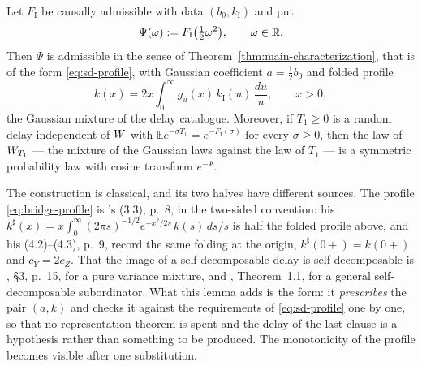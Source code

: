 \begin{lemma}\label{lem:bridge-exponents}
Let $F_{\mathrm I}$ be causally admissible with data $(b_0, k_{\mathrm I})$ and put
\begin{equation}\label{eq:bridge}
  \Psi(\omega) := F_{\mathrm I}\bigl(\tfrac12\omega^2\bigr), \qquad \omega \in \mathbb{R} .
\end{equation}
Then $\Psi$ is admissible in the sense of Theorem~\ref{thm:main-characterization}, that is of
the form \ref{eq:sd-profile}, with Gaussian coefficient $a = \tfrac12 b_0$ and folded profile
\begin{equation}\label{eq:bridge-profile}
  k(x) = 2x\int_0^\infty g_u(x)\,k_{\mathrm I}(u)\,\frac{du}{u}, \qquad x > 0,
\end{equation}
the Gaussian mixture of the delay catalogue. Moreover, if $T_1 \ge 0$ is a random delay
independent of $W$ with $\mathbb{E}e^{-\sigma T_1} = e^{-F_{\mathrm I}(\sigma)}$ for every
$\sigma \ge 0$, then the law of $W_{T_1}$ --- the mixture of the Gaussian laws against the law
of $T_1$ --- is a symmetric probability law with cosine transform $e^{-\Psi}$.
\end{lemma}

The construction is classical, and its two halves have different sources. The profile
\ref{eq:bridge-profile} is 's (3.3), p.~8, in the two-sided
convention: his $k^{\sharp}(x) = x\int_0^\infty(2\pi s)^{-1/2}e^{-x^2/2s}\,k(s)\,ds/s$ is half
the folded profile above, and his (4.2)--(4.3), p.~9, record the same folding at the origin,
$k^{\sharp}(0{+}) = k(0{+})$ and $c_Y = 2c_Z$. That the image of a self-decomposable delay is
self-decomposable is , \S3, p.~15, for a pure variance mixture, and
, Theorem~1.1, for a general self-decomposable subordinator. What
this lemma adds is the form: it \emph{prescribes} the pair $(a,k)$ and checks it against the
requirements of \ref{eq:sd-profile} one by one, so that no representation theorem is spent and
the delay of the last clause is a hypothesis rather than something to be produced. The
monotonicity of the profile becomes visible after one substitution.

